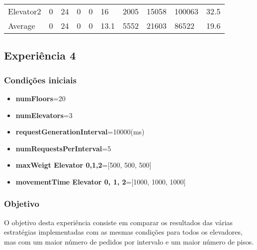 \documentclass[a4paper]{article}
\begin{document}
\begin{table}[h]
\begin{tabular}{@{}llllllllll@{}}
Elevator2 & 0        & 24            & 0           & 0                                                               & 16                                                                  & 2005                                                         & 15058                                                 & 100063                                                   & 32.5         \\
Average   & 0     & 24         & 0        & 0                                                               & 13.1                                                               & 5552                                                         & 21603                                                 &  86522                                                  & 19.6         \\ \bottomrule
\end{tabular}
\end{table}

\subsection{Experiência 4}

\subsubsection{Condições iniciais}

\begin{itemize}
\item \textbf{numFloors}=20
\item \textbf{numElevators}=3
\item \textbf{requestGenerationInterval}=10000(ms)
\item \textbf{numRequestsPerInterval}=5
\item \textbf{maxWeigt Elevator 0,1,2}=[500, 500, 500]
\item \textbf{movementTime Elevator 0, 1, 2}=[1000, 1000, 1000]
\end{itemize}

\subsubsection{Objetivo} 

O objetivo desta experiência consiste em comparar os resultados das várias estratégias implementadas com as mesmas condições para todos os elevadores, mas com um maior número de pedidos por intervalo e um maior número de pisos.
\end{document}
